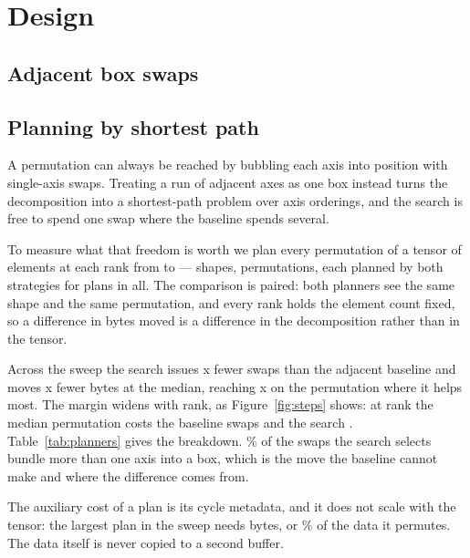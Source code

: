 \section{Design}
\label{sec:design}

\subsection{Adjacent box swaps}
\label{sec:boxes}


\subsection{Planning by shortest path}
\label{sec:planning}

A permutation can always be reached by bubbling each axis into position with
single-axis swaps. Treating a run of adjacent axes as one box instead turns
the decomposition into a shortest-path problem over axis orderings, and the
search is free to spend one swap where the baseline spends several.

To measure what that freedom is worth we plan every permutation of a tensor of
\planElements{} elements at each rank from \planRankLo{} to \planRankHi{} ---
\planRanks{} shapes, \planCases{} permutations, each planned by both
strategies for \planPlans{} plans in all. The comparison is paired: both
planners see the same shape and the same permutation, and every rank holds the
element count fixed, so a difference in bytes moved is a difference in the
decomposition rather than in the tensor.

Across the sweep the search issues \planStepFactor{}x fewer swaps than the
adjacent baseline and moves \planByteFactor{}x fewer bytes at the median,
reaching \planByteFactorMax{}x on the permutation where it helps most. The
margin widens with rank, as Figure~\ref{fig:steps} shows: at rank
\planRankHi{} the median permutation costs the baseline
\planStepsBaselineTop{} swaps and the search \planStepsSearchTop{}.
Table~\ref{tab:planners} gives the breakdown. \planBlockShare{}\% of the
swaps the search selects bundle more than one axis into a box, which is the
move the baseline cannot make and where the difference comes from.

The auxiliary cost of a plan is its cycle metadata, and it does not scale with
the tensor: the largest plan in the sweep needs \planAuxWorst{} bytes, or
\planAuxPercent{}\% of the data it permutes. The data itself is never copied
to a second buffer.

